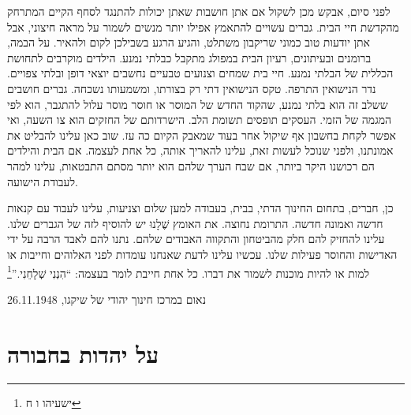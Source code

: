 \documentclass[14pt, article, extrafontsizes, twopage, a4paper]{memoir}
\newcommand{\attr}[1]{
{\raggedright\smaller#1}
}
\begin{document}
לפני סיום, אבקש מכן לשקול אם
אתן חושבות שאתן יכולות להתנגד לסחף הקיים המתרחק
מהקדשת חיי הבית. גברים עשויים להתאמץ אפילו יותר
מנשים לשמור על מראה חיצוני, אבל אתן יודעות טוב כמוני
שריקבון משתלט, והגיע הרגע
בשבילכן לקום ולהאיר. על הבמה,
ברומנים ובעיתונים, רעיון הבית במפולג
מתקבל כבלתי נמנע. הילדים מוקרבים
לתחושת הכללית של הבלתי נמנע.
חיי בית שמחים וצנועים טבעיים נחשבים
יוצאי דופן ובלתי צפויים. נדר הנישואין התרפה.
טקס הנישואין דתי רק בצורתו,
ומשמעותו נשכחה. גברים חושבים
ששלב זה הוא בלתי נמנע, שהקוד החדש של המוסר או
חוסר מוסר עלול להתגבר, הוא לפי המגמה של הזמי.
העסקים תופסים תשומת הלב. הישרדותם של החזקים
הוא צו השעה, ואי אפשר לקחת בחשבון אף שיקול אחר
בעוד שמאבק הקיום כה עז. שוב כאן
עלינו להבליט את אמונתנו, ולפני שנוכל לעשות זאת, עלינו להאריך אותה,
כל אחת לעצמה. אם הבית והילדים
הם רכושנו היקר ביותר, אם שבח
הערך שלהם הוא יותר מסתם התבטאות, עלינו
למהר לעבודת הישועה.

כן, חברים, בתחום החינוך הדתי, בבית,
בעבודה למען שלום וצניעות, עלינו לעבוד עם
קנאות חדשה ואמונה חדשה. התרומת נחוצה. את האומץ שֶׁלָנוּ
יש להוסיף לזה של הגברים שלנו. עלינו להחזיק
להם חלק מהביטחון והתקווה האבודים שלהם. נתנו
להם לאבד הרבה על ידי האדישות והחוסר פעילות שלנו. עכשיו עלינו
לדעת שאנחנו עומדות לפני האלוהים וחייבות או למות
או להיות מוכנות לשמור את דברו. כל אחת חייבת לומר
בעצמה: ``הִנְנִי שְׁלָחֵנִי.''\footnote{ישעיהו ו ח}

\attr{נאום במרכז חינוך יהודי של שיקגו, 26.11.1948}

\chapter{על יהדות בחבורה}
\end{document}
